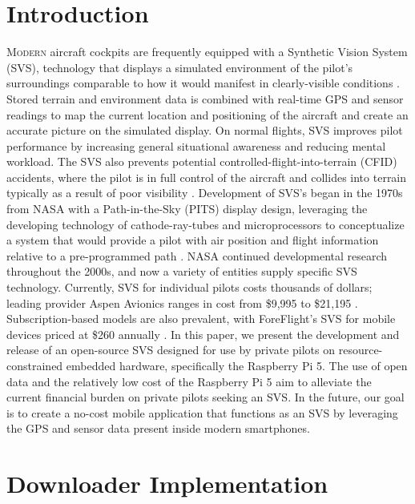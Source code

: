 \documentclass[journal ]{new-aiaa}
\begin{document}
\section{Introduction}
\lettrine{M}{odern} aircraft cockpits are frequently equipped with a Synthetic Vision System (SVS), technology that displays a simulated environment of the pilot's surroundings comparable to how it would manifest in clearly-visible conditions \cite{nasa2009svs}. Stored terrain and environment data is combined with real-time GPS and sensor readings to map the current location and positioning of the aircraft and create an accurate picture on the simulated display. On normal flights, SVS improves pilot performance by increasing general situational awareness and reducing mental workload. The SVS also prevents potential controlled-flight-into-terrain (CFID) accidents, where the pilot is in full control of the aircraft and collides into terrain typically as a result of poor visibility \cite{nasa2003cfit}. Development of SVS's began in the 1970s from NASA with a Path-in-the-Sky (PITS) display design, leveraging the developing technology of cathode-ray-tubes and microprocessors to conceptualize a system that would provide a pilot with air position and flight information relative to a pre-programmed path \cite{nasa1977pits}. NASA continued developmental research throughout the 2000s, and now a variety of entities supply specific SVS technology. Currently, SVS for individual pilots costs thousands of dollars; leading provider Aspen Avionics ranges in cost from \$9,995 to \$21,195 \cite{aspenavionicspricing}. Subscription-based models are also prevalent, with ForeFlight's SVS for mobile devices priced at \$260 annually \cite{foreflightpricing}. In this paper, we present the development and release of an open-source SVS designed for use by private pilots on resource-constrained embedded hardware, specifically the Raspberry Pi 5. The use of open data and the relatively low cost of the Raspberry Pi 5 aim to alleviate the current financial burden on private pilots seeking an SVS. In the future, our goal is to create a no-cost mobile application that functions as an SVS by leveraging the GPS and sensor data present inside modern smartphones.


\section{Downloader Implementation}
\end{document}
